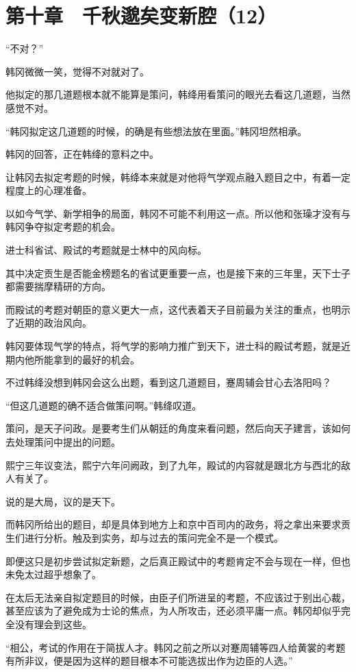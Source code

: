 \section{第十章　千秋邈矣变新腔（12）}

“不对？”

韩冈微微一笑，觉得不对就对了。

他拟定的那几道题根本就不能算是策问，韩绛用看策问的眼光去看这几道题，当然感觉不对。

“韩冈拟定这几道题的时候，的确是有些想法放在里面。”韩冈坦然相承。

韩冈的回答，正在韩绛的意料之中。

让韩冈去拟定考题的时候，韩绛本来就是对他将气学观点融入题目之中，有着一定程度上的心理准备。

以如今气学、新学相争的局面，韩冈不可能不利用这一点。所以他和张璪才没有与韩冈争夺拟定考题的机会。

进士科省试、殿试的考题就是士林中的风向标。

其中决定贡生是否能金榜题名的省试更重要一点，也是接下来的三年里，天下士子都需要揣摩精研的方向。

而殿试的考题对朝臣的意义更大一点，这代表着天子目前最为关注的重点，也明示了近期的政治风向。

韩冈要体现气学的特点，将气学的影响力推广到天下，进士科的殿试考题，就是近期内他所能拿到的最好的机会。

不过韩绛没想到韩冈会这么出题，看到这几道题目，蹇周辅会甘心去洛阳吗？

“但这几道题的确不适合做策问啊。”韩绛叹道。

策问，是天子问政。是要考生们从朝廷的角度来看问题，然后向天子建言，该如何去处理策问中提出的问题。

熙宁三年议变法，熙宁六年问阙政，到了九年，殿试的内容就是跟北方与西北的敌人有关了。

说的是大局，议的是天下。

而韩冈所给出的题目，却是具体到地方上和京中百司内的政务，将之拿出来要求贡生们进行分析。触及到实务，却与过去的策问完全不是一个模式。

即便这只是初步尝试拟定新题，之后真正殿试中的考题肯定不会与现在一样，但也未免太过超乎想象了。

在太后无法亲自拟定题目的时候，由臣子们所进呈的考题，不应该过于别出心裁，甚至应该为了避免成为士论的焦点，为人所攻击，还必须平庸一点。韩冈却似乎完全没有理会到这些。

“相公，考试的作用在于简拔人才。韩冈之前之所以对蹇周辅等四人给黄裳的考题有所非议，便是因为这样的题目根本不可能选拔出作为边臣的人选。”

